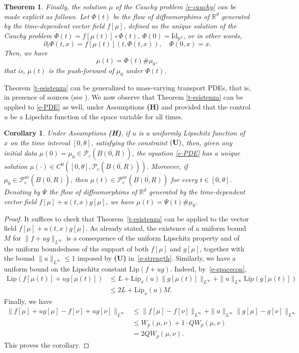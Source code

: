 \documentclass{article}
\newcommand{\R}{\mathbb{R}}
\newcommand{\PR}{\mathcal{P}_c(\overline{B(0,R)})}
\newcommand{\PRac}{\mathcal{P}^{ac}_c(\overline{B(0,R)})}
\newtheorem{theorem}{Theorem}
\newtheorem{corollary}{Corollary}
\theoremstyle{definition}\newtheorem{remark}{Remark}
\newcommand{\Lip}{\mathrm{Lip}}
\newcommand{\bproof}{\begin{proof}}
\newcommand{\eproof}{\end{proof}}
\renewcommand{\r}[1]{\eqref{#1}}
\begin{document}
\begin{theorem}
Finally, the solution $\mu$ of the Cauchy problem \eqref{e-cauchy} can be made explicit as follows.
Let $\Phi(t)$ be the flow of diffeomorphims of $\R^d$ generated by the time-dependent vector field $f[\mu]$, defined as the unique solution of the Cauchy problem $\dot\Phi(t) = f[\mu(t)] \circ \Phi(t)$, $\Phi(0)=\mathrm{Id}_{\R^d}$, or in other words,
$$
\partial_t\Phi(t,x) = f[\mu(t)](t,\Phi(t,x)),\quad \Phi(0,x)=x.
$$
Then, we have
$$
\mu(t) = \Phi(t)\#\mu_0,
$$
that is, $\mu(t)$ is the push-forward of $\mu_0$ under $\Phi(t)$.
\end{theorem}

Theorem \ref{t-esistenza} can be generalized to mass-varying transport PDEs, that is, in presence of sources (see \cite{genwass}).
We now observe that Theorem \ref{t-esistenza} can be applied to \r{e-PDE} as well, under Assumptions {\bf (H)} and provided that the control $u$ be a Lipschitz function of the space variable for all times.

\begin{corollary} 
Under Assumptions {\bf (H)}, if $u$ is a uniformly Lipschitz function of $x$ on the time interval $[0,\theta]$, satisfying the constraint ${\bf (U)}$, then, given any initial data $\mu(0)=\mu_0\in\PR$, the equation \r{e-PDE} has a unique solution $\mu(\cdot) \in C^0([0,\theta],\PR)$.
Moreover, if $\mu_0\in\PRac$, then $\mu(t)\in\PRac$ for every $t\in[0,\theta]$.
Denoting by $\Psi$ the flow of diffeomorphims of $\R^d$ generated by the time-dependent vector field $f[\mu]+u(t,x) g[\mu]$, we have $\mu(t) = \Psi(t)\#\mu_0$.
\end{corollary}

\bproof 
It suffices to check that Theorem~\ref{t-esistenza} can be applied to the vector field $f[\mu]+u(t,x) g[\mu]$. As already stated, the existence of a uniform bound $M$ for $\|f+ug\|_{L^\infty}$ is a consequence of the uniform Lipschitz property and of the uniform boundedness of the support of both $f[\mu]$ and $g[\mu]$, together with the bound $\|u\|_{L^\infty}\leq 1$ imposed by {\bf (U)} in~\eqref{e-strength}.
Similarly, we have a uniform bound on the Lipschitz constant $\Lip(f+ug)$. Indeed, by~\eqref{e-spacecon},
\begin{align}
 \mathrm{Lip}(f[\mu(t)]+ug[\mu(t)])&\leq L+\mathrm{Lip}_x(u)\|g[\mu(t)]\|_{L^\infty}+\|u\|_{L^\infty} \mathrm{Lip}(g[\mu(t)]) \nonumber \\
&\leq 2L+\mathrm{Lip}_x(u) M.
\label{e-stimaLip}
\end{align}
Finally, we have
\begin{align*}
\|f[\mu]+u g[\mu]-f[\nu]+u g[\nu]\|_{L^\infty}&\leq \|f[\mu]-f[\nu]\|_{L^\infty}+ \|u\|_{L^\infty} \|g[\mu]-g[\nu]\|_{L^\infty}\\
&\leq W_p(\mu,\nu)+1\cdot QW_p(\mu,\nu)\\
&=2QW_p(\mu,\nu).
\end{align*}
This proves the corollary.
\eproof
\end{document}
